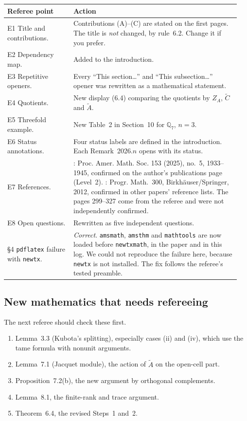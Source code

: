 \documentclass[12pt,letterpaper]{article}
\newcommand{\At}{\widetilde A}
\newcommand{\ZA}{Z_A}
\begin{document}
\begin{longtable}{@{}>{\raggedright\arraybackslash}p{0.27\linewidth}>{\raggedright\arraybackslash}p{0.68\linewidth}@{}}
\toprule
Referee point & Action\\
\midrule
\endhead
E1 Title and contributions. & Contributions (A)--(C) are stated on the
first pages. The title is \emph{not} changed, by rule~6.2. Change it if
you prefer.\\
E2 Dependency map. & Added to the introduction.\\
E3 Repetitive openers. & Every ``This section\dots'' and ``This
subsection\dots'' opener was rewritten as a mathematical statement.\\
E4 Quotients. & New display (6.4) comparing the quotients by $\ZA$,
$\widetilde C$ and $\At$.\\
E5 Threefold example. & New Table~2 in Section~10 for $\mathbb Q_7$,
$n=3$.\\
E6 Status annotations. & Four status labels are defined in the
introduction. Each Remark~2026.$n$ opens with its status.\\
E7 References. & \cite{Sz25}: Proc. Amer. Math. Soc. 153 (2025), no.~5,
1933--1945, confirmed on the author's publications page (Level~2).
\cite{Mc12}: Progr. Math.~300, Birkh\"auser/Springer, 2012, confirmed
in other papers' reference lists. The pages 299--327 come from the
referee and were not independently confirmed.\\
E8 Open questions. & Rewritten as five independent questions.\\
\S4 \texttt{pdflatex} failure with \texttt{newtx}. & \emph{Correct}.
\texttt{amsmath}, \texttt{amsthm} and \texttt{mathtools} are now loaded
before \texttt{newtxmath}, in the paper and in this log. We could not
reproduce the failure here, because \texttt{newtx} is not installed.
The fix follows the referee's tested preamble.\\
\bottomrule
\end{longtable}

\subsection{New mathematics that needs refereeing}

The next referee should check these first.
\begin{enumerate}[leftmargin=*]
\item Lemma~3.3 (Kubota's splitting), especially cases (ii) and (iv),
  which use the tame formula with nonunit arguments.
\item Lemma~7.1 (Jacquet module), the action of $\At$ on the open-cell
  part.
\item Proposition~7.2(b), the new argument by orthogonal complements.
\item Lemma~8.1, the finite-rank and trace argument.
\item Theorem~6.4, the revised Steps~1 and~2.
\end{enumerate}
\end{document}
